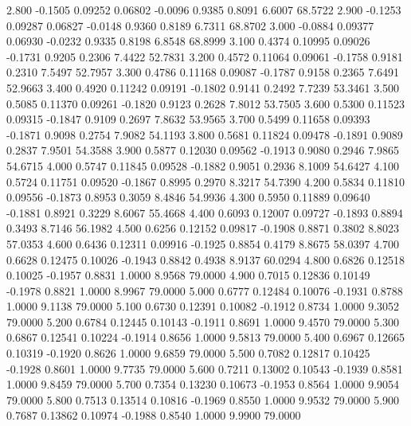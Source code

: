    2.800  -0.1505   0.09252   0.06802  -0.0096   0.9385   0.8091   6.6007  68.5722
   2.900  -0.1253   0.09287   0.06827  -0.0148   0.9360   0.8189   6.7311  68.8702
   3.000  -0.0884   0.09377   0.06930  -0.0232   0.9335   0.8198   6.8548  68.8999
   3.100   0.4374   0.10995   0.09026  -0.1731   0.9205   0.2306   7.4422  52.7831
   3.200   0.4572   0.11064   0.09061  -0.1758   0.9181   0.2310   7.5497  52.7957
   3.300   0.4786   0.11168   0.09087  -0.1787   0.9158   0.2365   7.6491  52.9663
   3.400   0.4920   0.11242   0.09191  -0.1802   0.9141   0.2492   7.7239  53.3461
   3.500   0.5085   0.11370   0.09261  -0.1820   0.9123   0.2628   7.8012  53.7505
   3.600   0.5300   0.11523   0.09315  -0.1847   0.9109   0.2697   7.8632  53.9565
   3.700   0.5499   0.11658   0.09393  -0.1871   0.9098   0.2754   7.9082  54.1193
   3.800   0.5681   0.11824   0.09478  -0.1891   0.9089   0.2837   7.9501  54.3588
   3.900   0.5877   0.12030   0.09562  -0.1913   0.9080   0.2946   7.9865  54.6715
   4.000   0.5747   0.11845   0.09528  -0.1882   0.9051   0.2936   8.1009  54.6427
   4.100   0.5724   0.11751   0.09520  -0.1867   0.8995   0.2970   8.3217  54.7390
   4.200   0.5834   0.11810   0.09556  -0.1873   0.8953   0.3059   8.4846  54.9936
   4.300   0.5950   0.11889   0.09640  -0.1881   0.8921   0.3229   8.6067  55.4668
   4.400   0.6093   0.12007   0.09727  -0.1893   0.8894   0.3493   8.7146  56.1982
   4.500   0.6256   0.12152   0.09817  -0.1908   0.8871   0.3802   8.8023  57.0353
   4.600   0.6436   0.12311   0.09916  -0.1925   0.8854   0.4179   8.8675  58.0397
   4.700   0.6628   0.12475   0.10026  -0.1943   0.8842   0.4938   8.9137  60.0294
   4.800   0.6826   0.12518   0.10025  -0.1957   0.8831   1.0000   8.9568  79.0000
   4.900   0.7015   0.12836   0.10149  -0.1978   0.8821   1.0000   8.9967  79.0000
   5.000   0.6777   0.12484   0.10076  -0.1931   0.8788   1.0000   9.1138  79.0000
   5.100   0.6730   0.12391   0.10082  -0.1912   0.8734   1.0000   9.3052  79.0000
   5.200   0.6784   0.12445   0.10143  -0.1911   0.8691   1.0000   9.4570  79.0000
   5.300   0.6867   0.12541   0.10224  -0.1914   0.8656   1.0000   9.5813  79.0000
   5.400   0.6967   0.12665   0.10319  -0.1920   0.8626   1.0000   9.6859  79.0000
   5.500   0.7082   0.12817   0.10425  -0.1928   0.8601   1.0000   9.7735  79.0000
   5.600   0.7211   0.13002   0.10543  -0.1939   0.8581   1.0000   9.8459  79.0000
   5.700   0.7354   0.13230   0.10673  -0.1953   0.8564   1.0000   9.9054  79.0000
   5.800   0.7513   0.13514   0.10816  -0.1969   0.8550   1.0000   9.9532  79.0000
   5.900   0.7687   0.13862   0.10974  -0.1988   0.8540   1.0000   9.9900  79.0000
